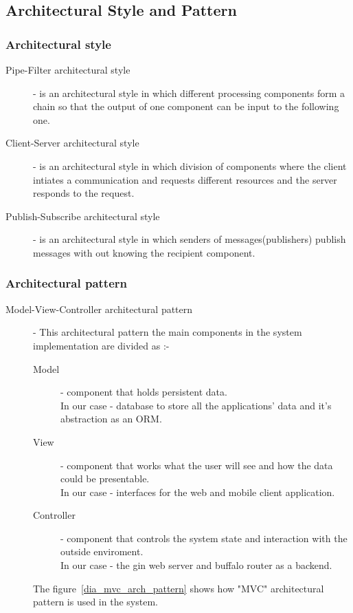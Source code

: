 	\subsection{Architectural Style and Pattern}

		\subsubsection{Architectural style}

		\begin{description}
			\item[Pipe-Filter architectural style] - is an architectural style in which different processing components form a chain so that the output of one component can be input to the following one.
			
			\item[Client-Server architectural style] - is an architectural style in which division of components where the client intiates a communication and requests different resources and the server responds to the request.
			
			\item[Publish-Subscribe architectural style] - is an architectural style in which senders of messages(publishers) publish messages with out knowing the recipient component.
		\end{description}

		\subsubsection{Architectural pattern}

		\begin{description}
			\item[Model-View-Controller architectural pattern] - This architectural pattern the main components in the system implementation are divided as :-
			\begin{description}
				\item[Model] - component that holds persistent data. \\
				In our case - database to store all the applications' data and it's abstraction as an ORM.
				\item[View] - component that works what the user will see and how the data could be presentable.\\
				In our case - interfaces for the web and mobile client application.
				\item[Controller] - component that controls the system state and interaction with the outside enviroment.\\
				In our case - the gin web server and buffalo router as a backend.
			\end{description}
			The figure~\ref{dia_mvc_arch_pattern} shows how "MVC" architectural pattern is used in the system.
		\end{description}

